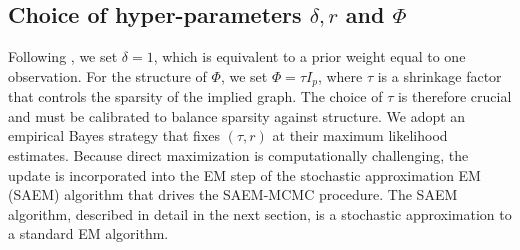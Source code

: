 \subsection{Choice of hyper-parameters $\delta,r$ and $\Phi$}
Following \textcite{donnet2012empirical}, we set $\delta = 1$, which is equivalent to a prior weight equal to one observation. For the structure of $\Phi$, we set $\Phi = \tau I_p$, where $\tau$ is a shrinkage factor that controls the sparsity of the implied graph. The choice of $\tau$ is therefore crucial and must be calibrated to balance sparsity against structure. We adopt an empirical Bayes strategy that fixes $(\tau, r)$ at their maximum likelihood estimates. Because direct maximization is computationally challenging, the update is incorporated into the EM step of the stochastic approximation EM (SAEM) algorithm that drives the SAEM-MCMC procedure. The SAEM algorithm, described in detail in the next section, is a stochastic approximation to a standard EM algorithm.